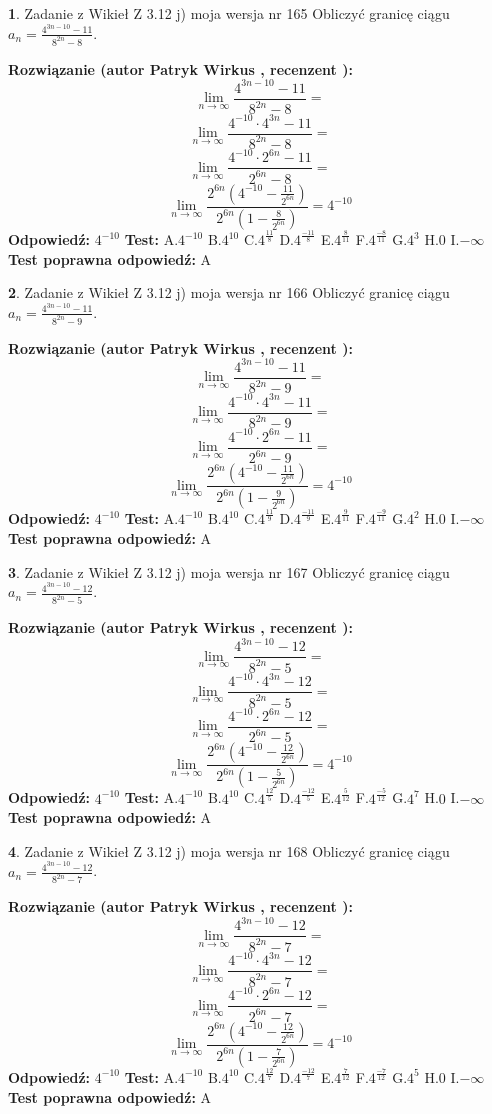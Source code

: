 \documentclass[12pt, a4paper]{article}
\theoremstyle{definition} %
\newtheorem{zad}{}
\newcommand{\zadStart}[1]{\begin{zad}#1\newline}
\newcommand{\zadStop}{\end{zad}}
\newcommand{\rozwStart}[2]{\noindent \textbf{Rozwiązanie (autor #1 , recenzent #2): }\newline}
\newcommand{\rozwStop}{\newline}
\newcommand{\odpStart}{\noindent \textbf{Odpowiedź:}\newline}
\newcommand{\odpStop}{\newline}
\newcommand{\testStart}{\noindent \textbf{Test:}\newline}
\newcommand{\testStop}{\newline}
\newcommand{\kluczStart}{\noindent \textbf{Test poprawna odpowiedź:}\newline}
\newcommand{\kluczStop}{\newline}
\begin{document}
\zadStart{Zadanie z Wikieł Z 3.12 j) moja wersja nr 165}
Obliczyć granicę ciągu $a_{n}=\frac{4^{3n-10}-11}{8^{2n}-8}$.
\zadStop
\rozwStart{Patryk Wirkus}{}
$$\lim\limits_{n\to\infty}\frac{4^{3n-10}-11}{8^{2n}-8}=$$
$$\lim\limits_{n\to\infty}\frac{4^{-10} \cdot 4^{3n}-11}{8^{2n}-8}=$$
$$\lim\limits_{n\to\infty}\frac{4^{-10} \cdot 2^{6n}-11}{2^{6n}-8}=$$
$$\lim\limits_{n\to\infty}\frac{2^{6n}(4^{-10} - \frac{11}{2^{6n}})}{2^{6n}(1-\frac{8}{2^{6n}})}= 4^{-10}$$
\rozwStop
\odpStart
$4^{-10}$
\odpStop
\testStart
A.$4^{-10}$
B.$4^{10}$
C.$4^{\frac{11}{8}}$
D.$4^{\frac{-11}{8}}$
E.$4^{\frac{8}{11}}$
F.$4^{\frac{-8}{11}}$
G.$4^{3}$
H.$0$
I.$-\infty$
\testStop
\kluczStart
A
\kluczStop



\zadStart{Zadanie z Wikieł Z 3.12 j) moja wersja nr 166}
Obliczyć granicę ciągu $a_{n}=\frac{4^{3n-10}-11}{8^{2n}-9}$.
\zadStop
\rozwStart{Patryk Wirkus}{}
$$\lim\limits_{n\to\infty}\frac{4^{3n-10}-11}{8^{2n}-9}=$$
$$\lim\limits_{n\to\infty}\frac{4^{-10} \cdot 4^{3n}-11}{8^{2n}-9}=$$
$$\lim\limits_{n\to\infty}\frac{4^{-10} \cdot 2^{6n}-11}{2^{6n}-9}=$$
$$\lim\limits_{n\to\infty}\frac{2^{6n}(4^{-10} - \frac{11}{2^{6n}})}{2^{6n}(1-\frac{9}{2^{6n}})}= 4^{-10}$$
\rozwStop
\odpStart
$4^{-10}$
\odpStop
\testStart
A.$4^{-10}$
B.$4^{10}$
C.$4^{\frac{11}{9}}$
D.$4^{\frac{-11}{9}}$
E.$4^{\frac{9}{11}}$
F.$4^{\frac{-9}{11}}$
G.$4^{2}$
H.$0$
I.$-\infty$
\testStop
\kluczStart
A
\kluczStop



\zadStart{Zadanie z Wikieł Z 3.12 j) moja wersja nr 167}
Obliczyć granicę ciągu $a_{n}=\frac{4^{3n-10}-12}{8^{2n}-5}$.
\zadStop
\rozwStart{Patryk Wirkus}{}
$$\lim\limits_{n\to\infty}\frac{4^{3n-10}-12}{8^{2n}-5}=$$
$$\lim\limits_{n\to\infty}\frac{4^{-10} \cdot 4^{3n}-12}{8^{2n}-5}=$$
$$\lim\limits_{n\to\infty}\frac{4^{-10} \cdot 2^{6n}-12}{2^{6n}-5}=$$
$$\lim\limits_{n\to\infty}\frac{2^{6n}(4^{-10} - \frac{12}{2^{6n}})}{2^{6n}(1-\frac{5}{2^{6n}})}= 4^{-10}$$
\rozwStop
\odpStart
$4^{-10}$
\odpStop
\testStart
A.$4^{-10}$
B.$4^{10}$
C.$4^{\frac{12}{5}}$
D.$4^{\frac{-12}{5}}$
E.$4^{\frac{5}{12}}$
F.$4^{\frac{-5}{12}}$
G.$4^{7}$
H.$0$
I.$-\infty$
\testStop
\kluczStart
A
\kluczStop



\zadStart{Zadanie z Wikieł Z 3.12 j) moja wersja nr 168}
Obliczyć granicę ciągu $a_{n}=\frac{4^{3n-10}-12}{8^{2n}-7}$.
\zadStop
\rozwStart{Patryk Wirkus}{}
$$\lim\limits_{n\to\infty}\frac{4^{3n-10}-12}{8^{2n}-7}=$$
$$\lim\limits_{n\to\infty}\frac{4^{-10} \cdot 4^{3n}-12}{8^{2n}-7}=$$
$$\lim\limits_{n\to\infty}\frac{4^{-10} \cdot 2^{6n}-12}{2^{6n}-7}=$$
$$\lim\limits_{n\to\infty}\frac{2^{6n}(4^{-10} - \frac{12}{2^{6n}})}{2^{6n}(1-\frac{7}{2^{6n}})}= 4^{-10}$$
\rozwStop
\odpStart
$4^{-10}$
\odpStop
\testStart
A.$4^{-10}$
B.$4^{10}$
C.$4^{\frac{12}{7}}$
D.$4^{\frac{-12}{7}}$
E.$4^{\frac{7}{12}}$
F.$4^{\frac{-7}{12}}$
G.$4^{5}$
H.$0$
I.$-\infty$
\testStop
\kluczStart
A
\kluczStop
\end{document}
